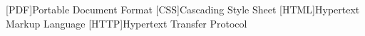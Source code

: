 \begin{acronym}[ECU]
[PDF]{Portable Document Format}
[CSS]{Cascading Style Sheet}
[HTML]{Hypertext Markup Language}
[HTTP]{Hypertext Transfer Protocol}
\end{acronym}
